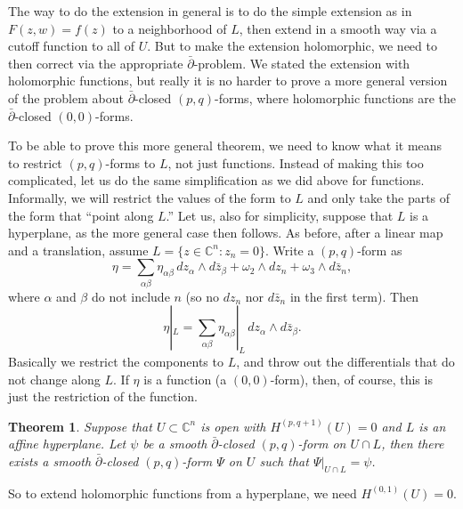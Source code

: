 \documentclass[12pt,openany]{book}
\newcommand{\C}{{\mathbb{C}}}
\theoremstyle{plain}
\newtheorem{thm}{Theorem}[section]
\theoremstyle{remark}
\theoremstyle{definition}
\theoremstyle{exercise}
\theoremstyle{example}
\begin{document}
The way to do the extension in general is to do the simple
extension as in $F(z,w)=f(z)$ to a neighborhood of $L$,
then extend in a smooth way via a cutoff function to all of $U$.
But to make the extension holomorphic, we
need to then correct via the appropriate $\bar{\partial}$-problem.
We stated the extension with holomorphic functions, but really it is no harder to
prove a more general version of the problem about
$\bar{\partial}$-closed $(p,q)$-forms, where holomorphic functions
are the $\bar{\partial}$-closed $(0,0)$-forms.

To be able to prove this more general theorem, we need to know what it means
to restrict $(p,q)$-forms to $L$, not just functions.
Instead of making this too complicated, let us do the same
simplification as we did above for functions.
Informally, we will restrict the values of the form
to $L$ and only take the parts of the form that ``point along $L$.''
Let us, also for simplicity, suppose that $L$ is a hyperplane, as the more
general case then follows.
As before,
after a linear map and a translation, assume $L = \{ z \in \C^n : z_n = 0 \}$.
Write a $(p,q)$-form as
\begin{equation*}
\eta = \sum_{\alpha\beta} \eta_{\alpha\beta} \, dz_{\alpha} \wedge d\bar{z}_{\beta}
+ \omega_2 \wedge dz_n + \omega_3 \wedge d\bar{z}_n ,
\end{equation*}
where $\alpha$ and $\beta$ do not include $n$ (so no $dz_n$ nor $d\bar{z}_n$
in the first term).  Then
\begin{equation*}
\eta|_L = \sum_{\alpha\beta} \eta_{\alpha\beta}|_L \, dz_{\alpha} \wedge
d\bar{z}_{\beta} .
\end{equation*}
Basically we restrict the components to $L$, and throw out the differentials
that do not change along $L$.  If $\eta$ is a function (a $(0,0)$-form),
then, of course, this
is just the restriction of the function.

\begin{thm}
Suppose that $U \subset \C^n$ is open with $H^{(p,q+1)}(U) = 0$ and
$L$ is an affine hyperplane.
Let $\psi$ be a smooth $\bar{\partial}$-closed $(p,q)$-form on
$U \cap L$, then there exists a smooth $\bar{\partial}$-closed $(p,q)$-form
$\Psi$ on $U$ such that $\Psi|_{U \cap L} = \psi$.
\end{thm}

So to extend holomorphic functions from a hyperplane,
we need $H^{(0,1)}(U) = 0$.
\end{document}
